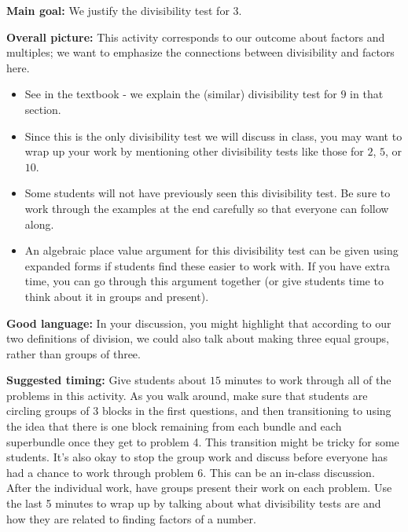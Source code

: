 \documentclass[nooutcomes,noauthor,handout]{ximera}
\begin{document}
\begin{instructorNotes} 



{\bf Main goal:} We justify the divisibility test for 3.


{\bf Overall picture:} This activity corresponds to our outcome about factors and multiples; we want to emphasize the connections between divisibility and factors here. 

\begin{itemize}
	\item See  in the textbook - we explain the (similar) divisibility test for $9$ in that section.
	\item Since this is the only divisibility test we will discuss in class, you may want to wrap up your work by mentioning other divisibility tests like those for $2$, $5$, or $10$.
	\item Some students will not have previously seen this divisibility test. Be sure to work through the examples at the end carefully so that everyone can follow along.
	\item An algebraic place value argument for this divisibility test can be given using expanded forms if students find these easier to work with. If you have extra time, you can go through this argument together (or give students time to think about it in groups and present).
\end{itemize}


{\bf Good language:}  In your discussion, you might highlight that according to our two definitions of division, we could also talk about making three equal groups, rather than groups of three.


{\bf Suggested timing:} Give students about $15$ minutes to work through all of the problems in this activity. As you walk around, make sure that students are circling groups of $3$ blocks in the first questions, and then transitioning to using the idea that there is one block remaining from each bundle and each superbundle once they get to problem 4. This transition might be tricky for some students. It's also okay to stop the group work and discuss before everyone has had a chance to work through problem 6. This can be an in-class discussion. After the individual work, have groups present their work on each problem. Use the last 5 minutes to wrap up by talking about what divisibility tests are and how they are related to finding factors of a number. 




\end{instructorNotes}
\end{document}
